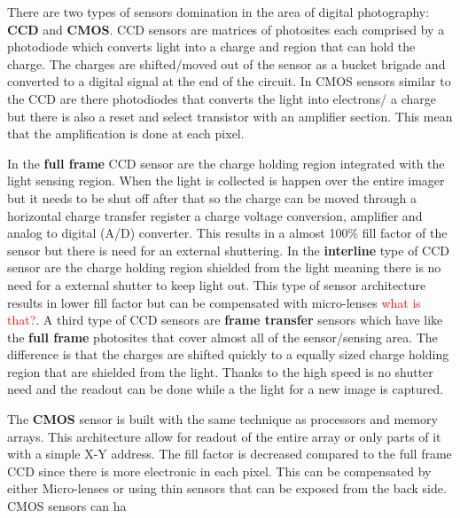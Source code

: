 There are two types of sensors domination in the area of digital photography: \textbf{CCD} and \textbf{CMOS}. CCD sensors are matrices of photosites each comprised by a photodiode which converts light into a charge and region that can hold the charge. The charges are shifted/moved out of the sensor as a bucket brigade and converted to a digital signal at the end of the circuit. In CMOS sensors similar to the CCD are there photodiodes that converts the light into electrons/ a charge but there is also a reset and select transistor with an amplifier section. This mean that the amplification is done at each pixel. 

In the \textbf{full frame} CCD sensor are the charge holding region integrated with the light sensing region. When the light is collected is happen over the entire imager but it needs to be shut off after that so the charge can be moved through a horizontal charge transfer register a charge voltage conversion, amplifier and analog to digital (A/D) converter. This results in a almost 100\% fill factor of the sensor but there is need for an external shuttering. In the \textbf{interline} type of CCD sensor are the charge holding region shielded from the light meaning there is no need for a external shutter to keep light out. This type of sensor architecture results in lower fill factor but can be compensated with micro-lenses \textcolor{red}{what is that?}. A third type of CCD sensors are \textbf{frame transfer} sensors which have like the \textbf{full frame} photosites that cover almost all of the sensor/sensing area. The difference is that the charges are shifted quickly to a equally sized charge holding region that are shielded from the light. Thanks to the high speed is no shutter need and the readout can be done while a the light for a new image is captured. 

The \textbf{CMOS} sensor is built with the same technique as processors and memory arrays. This architecture allow for readout of the entire array or only parts of it with a simple X-Y address. The fill factor is decreased compared to the full frame CCD since there is more electronic in each pixel. This can be compensated by either Micro-lenses or using thin sensors that can  be exposed from the back side. CMOS sensors can ha

